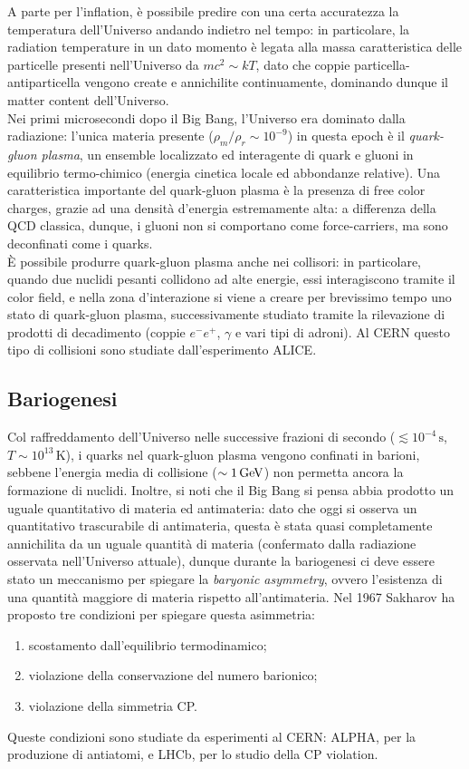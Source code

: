 A parte per l'inflation, è possibile predire con una certa accuratezza la temperatura dell'Universo andando indietro nel tempo: in particolare, la radiation temperature in un dato momento è legata alla massa caratteristica delle particelle presenti nell'Universo da $ mc^2 \sim kT $, dato che coppie particella-antiparticella vengono create e annichilite continuamente, dominando dunque il matter content dell'Universo. \\
Nei primi microsecondi dopo il Big Bang, l'Universo era dominato dalla radiazione: l'unica materia presente ($ \rho_m / \rho_r \sim 10^{-9} $) in questa epoch è il \textit{quark-gluon plasma}, un ensemble localizzato ed interagente di quark e gluoni in equilibrio termo-chimico (energia cinetica locale ed abbondanze relative). Una caratteristica importante del quark-gluon plasma è la presenza di free color charges, grazie ad una densità d'energia estremamente alta: a differenza della QCD classica, dunque, i gluoni non si comportano come force-carriers, ma sono deconfinati come i quarks. \\
È possibile produrre quark-gluon plasma anche nei collisori: in particolare, quando due nuclidi pesanti collidono ad alte energie, essi interagiscono tramite il color field, e nella zona d'interazione si viene a creare per brevissimo tempo uno stato di quark-gluon plasma, successivamente studiato tramite la rilevazione di prodotti di decadimento (coppie $ e^- e^+ $, $ \gamma $ e vari tipi di adroni). Al CERN questo tipo di collisioni sono studiate dall'esperimento ALICE.

\subsection{Bariogenesi}

Col raffreddamento dell'Universo nelle successive frazioni di secondo ($ \lesssim 10^{-4} \,\text{s} $, $ T \sim 10^{13} \,\text{K} $), i quarks nel quark-gluon plasma vengono confinati in barioni, sebbene l'energia media di collisione ($ \sim 1 \,\mathrm{GeV} $) non permetta ancora la formazione di nuclidi. Inoltre, si noti che il Big Bang si pensa abbia prodotto un uguale quantitativo di materia ed antimateria: dato che oggi si osserva un quantitativo trascurabile di antimateria, questa è stata quasi completamente annichilita da un uguale quantità di materia (confermato dalla radiazione osservata nell'Universo attuale), dunque durante la bariogenesi ci deve essere stato un meccanismo per spiegare la \textit{baryonic asymmetry}, ovvero l'esistenza di una quantità maggiore di materia rispetto all'antimateria. Nel 1967 Sakharov ha proposto tre condizioni per spiegare questa asimmetria:
\begin{enumerate}
	\item scostamento dall'equilibrio termodinamico;
	\item violazione della conservazione del numero barionico;
	\item violazione della simmetria CP.
\end{enumerate}
Queste condizioni sono studiate da esperimenti al CERN: ALPHA, per la produzione di antiatomi, e LHCb, per lo studio della CP violation.

